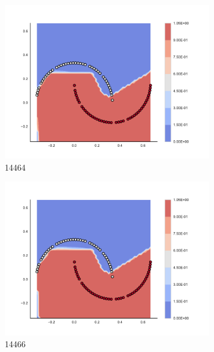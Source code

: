 \begin{figure}[h]
\begin{subfigure}[b]{0.09\textwidth}
    \includegraphics[clip, trim=2.35cm 1.75cm 4.5cm 0cm,width=\textwidth]{img/convergence/14464.pdf}
    \caption{14464}
    \label{fig:convergence_14464}
\end{subfigure}
%
\begin{subfigure}[b]{0.09\textwidth}
    \includegraphics[clip, trim=2.35cm 1.75cm 4.5cm 0cm,width=\textwidth]{img/convergence/14466.pdf}
    \caption{14466}
    \label{fig:convergence_14466}
\end{subfigure}
%
\begin{subfigure}[b]{0.09\textwidth}

\end{subfigure}
\end{figure}
